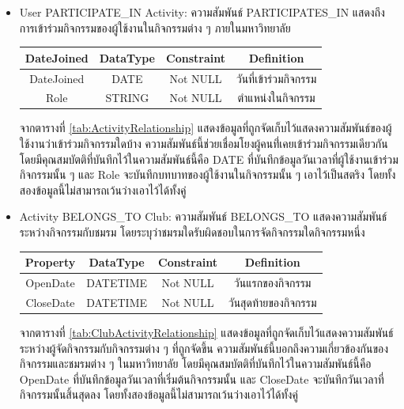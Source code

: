 \documentclass[14pt,oneside,openright,a4paper]{cpe-thai-project}
\begin{document}
\begin{itemize}
      \newpage
        \item User PARTICIPATE\_IN Activity: ความสัมพันธ์ PARTICIPATES\_IN แสดงถึงการเข้าร่วมกิจกรรมของผู้ใช้งานในกิจกรรมต่าง ๆ ภายในมหาวิทยาลัย
        \begin{center}
          \begin{tabular}{|c|c|c|c|}
          \hline
          \rowcolor[HTML]{9FC5E8} 
          DateJoined & DataType & Constraint & Definition \\ \hline
          DateJoined & DATE     & Not NULL    & วันที่เข้าร่วมกิจกรรม \\ \hline
          Role       & STRING   & Not NULL    & ตำแหน่งในกิจกรรม \\ \hline
          \end{tabular}
          \label{tab:ActivityRelationship}
        \end{center}
        จากตารางที่ \ref{tab:ActivityRelationship} แสดงข้อมูลที่ถูกจัดเก็บไว้แสดงความสัมพันธ์ของผู้ใช้งานว่าเข้าร่วมกิจกรรมใดบ้าง ความสัมพันธ์นี้ช่วยเชื่อมโยงผู้คนที่่เคยเข้าร่วมกิจกรรมเดียวกัน โดยมีคุณสมบัตติที่บันทึกไว้ในความสัมพันธ์นี้คือ DATE ที่บันทึกข้อมูลวันเวลาที่ผู้ใช้งานเข้าร่วมกิจกรรมนั้น ๆ และ Role จะบันทึกบทบาทของผู้ใช้งานในกิจกรรมนั้น ๆ เอาไว้เป็นสตริง โดยทั้งสองข้อมูลนี้ไม่สามารถเว้นว่างเอาไว้ได้ทั้งคู่
        \item Activity BELONGS\_TO Club: ความสัมพันธ์ BELONGS\_TO แสดงความสัมพันธ์ระหว่างกิจกรรมกับชมรม โดยระบุว่าชมรมใดรับผิดชอบในการจัดกิจกรรมใดกิจกรรมหนึ่ง
        \begin{center}
          \begin{tabular}{|c|c|c|c|}
          \hline
          \rowcolor[HTML]{9FC5E8} 
          Property   & DataType & Constraint & Definition \\ \hline
          OpenDate   & DATETIME & Not NULL    & วันแรกของกิจกรรม \\ \hline
          CloseDate  & DATETIME & Not NULL    & วันสุดท้ายของกิจกรรม \\ \hline
          \end{tabular}
          \label{tab:ClubActivityRelationship}
        \end{center}
        จากตารางที่ \ref{tab:ClubActivityRelationship} แสดงข้อมูลที่ถูกจัดเก็บไว้แสดงความสัมพันธ์ระหว่างผู้จัดกิจกรรมกับกิจกรรมต่าง ๆ ที่ถูกจัดขึ้น ความสัมพันธ์นี้บอกถึงความเกี่ยวข้องกันของกิจกรรมและชมรมต่าง ๆ ในมหาวิทยาลัย โดยมีคุณสมบัตติที่บันทึกไว้ในความสัมพันธ์นี้คือ OpenDate ที่บันทึกข้อมูลวันเวลาที่เริ่มต้นกิจกรรมนั้น และ CloseDate จะบันทึกวันเวลาที่กิจกรรมนั้นสิ้นสุดลง โดยทั้งสองข้อมูลนี้ไม่สามารถเว้นว่างเอาไว้ได้ทั้งคู่
    \end{itemize}    
\end{document}
